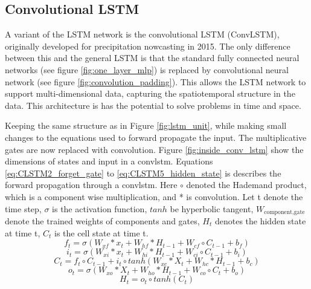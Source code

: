 \subsection{Convolutional LSTM}  \label{sec:convolutional_lstm}
A variant of the LSTM network is the convolutional LSTM (ConvLSTM), originally developed for precipitation nowcasting in 2015. The only difference between this and the general LSTM is that the standard fully connected neural networks (see figure \ref{fig:one_layer_mlp}) is replaced by convolutional neural network (see figure \ref{fig:convolution_padding}). This allows the LSTM network to support multi-dimensional data, capturing the spatiotemporal structure in the data. This architecture is has the potential to solve problems in time and space.

Keeping the same structure as in Figure \ref{fig:lstm_unit}, while making small changes to the equations used to forward propagate the input. The multiplicative gates are now replaced with convolution. 
Figure \ref{fig:inside_conv_lstm} show the dimensions of states and input in a \acrshort{convlstm}. Equations \eqref{eq:CLSTM2_forget_gate} to \eqref{eq:CLSTM5_hidden_state} is describes the forward propagation through a \acrshort{convlstm}. Here $\circ$ denoted the Hademand product, which is a component wise multiplication, and * is convolution. Let t denote the time step, $\sigma$ is the activation function, $tanh$ be hyperbolic tangent, $W_{\text{component}, \text{gate}}$ denote the trained weights of components and gates, $H_{t}$ denotes the hidden state at time t, $C_{t}$ is the cell state at time t. 
\begin{equation} \label{eq:CLSTM2_forget_gate}
        f_t = \sigma \left( W_{xf}*x_t + W_{hf}*H_{t-1} + W_{cf}\circ C_{t-1}+b_f \right)
\end{equation}
\begin{equation} \label{eq:CLSTM1_input_gate}
    i_t = \sigma \left( W_{xi}*x_t + W_{hi}*H_{t-1} + W_{ci}\circ C_{t-1}+b_i \right) 
\end{equation}
\begin{equation} \label{eq:CLSTM3_cellstate}
        C_t = f_t \circ C_{t-1} +i_t\circ tanh\left( W_{xc}*X_t + W_{hc}*H_{t-1} + b_c \right)
\end{equation}
\begin{equation} \label{eq:CLSTM4_output_gate}
        o_t = \sigma \left( W_{xo}*X_t + W_{ho}*H_{t-1} + W_{co}\circ C_{t}+b_o \right)
\end{equation}
\begin{equation} \label{eq:CLSTM5_hidden_state}
        H_t = o_t \circ tanh \left( C_t \right)
\end{equation}

